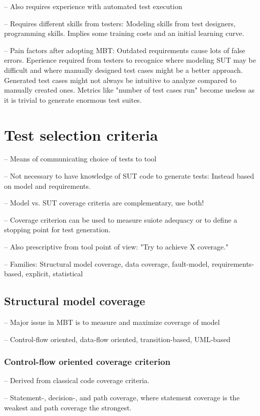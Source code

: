 -- Also requires experience with automated test execution

-- Requires different skills from testers: Modeling skills from test designers, programming skills. Implies some training costs and an initial learning curve.

-- Pain factors after adopting MBT: Outdated requirements cause lots of false errors. Eperience required from testers to recognice where modeling SUT may be difficult and where manually designed test cases might be a better approach. Generated test cases might not always be intuitive to analyze compared to manually created ones. Metrics like "number of test cases run" become useless as it is trivial to generate enormous test suites.

\section{Test selection criteria}
-- Means of communicating choice of tests to tool

-- Not necessary to have knowledge of SUT code to generate tests: Instead based on model and requirements.

-- Model vs. SUT coverage criteria are complementary, use both!

-- Coverage criterion can be used to measure suiote adequacy or to define a stopping point for test generation.

-- Also prescriptive from tool point of view: "Try to achieve X coverage."

-- Families: Structural model coverage, data coverage, fault-model, requirements-based, explicit, statistical

\subsection{Structural model coverage}
-- Major issue in MBT is to measure and maximize coverage of model

-- Control-flow oriented, data-flow oriented, transition-based, UML-based

\subsubsection{Control-flow oriented coverage criterion}
--  Derived from classical code coverage criteria.

-- Statement-, decision-, and path coverage, where statement coverage is the weakest and path coverage the strongest.

